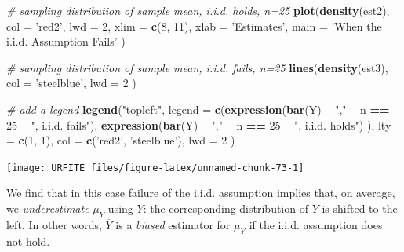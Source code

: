 \documentclass[]{book}
\newenvironment{Shaded}{\begin{snugshade}}{\end{snugshade}}
\newcommand{\KeywordTok}[1]{\textcolor[rgb]{0.13,0.29,0.53}{\textbf{#1}}}
\newcommand{\DataTypeTok}[1]{\textcolor[rgb]{0.13,0.29,0.53}{#1}}
\newcommand{\DecValTok}[1]{\textcolor[rgb]{0.00,0.00,0.81}{#1}}
\newcommand{\StringTok}[1]{\textcolor[rgb]{0.31,0.60,0.02}{#1}}
\newcommand{\CommentTok}[1]{\textcolor[rgb]{0.56,0.35,0.01}{\textit{#1}}}
\newcommand{\OperatorTok}[1]{\textcolor[rgb]{0.81,0.36,0.00}{\textbf{#1}}}
\newcommand{\NormalTok}[1]{#1}
\theoremstyle{definition}
\theoremstyle{definition}
\theoremstyle{definition}
\theoremstyle{remark}
\begin{document}
\begin{Shaded}
\begin{Highlighting}[]
\CommentTok{# sampling distribution of sample mean, i.i.d. holds, n=25}
\KeywordTok{plot}\NormalTok{(}\KeywordTok{density}\NormalTok{(est2), }
      \DataTypeTok{col =} \StringTok{'red2'}\NormalTok{,}
      \DataTypeTok{lwd =} \DecValTok{2}\NormalTok{,}
      \DataTypeTok{xlim =} \KeywordTok{c}\NormalTok{(}\DecValTok{8}\NormalTok{, }\DecValTok{11}\NormalTok{),}
      \DataTypeTok{xlab =} \StringTok{'Estimates'}\NormalTok{,}
      \DataTypeTok{main =} \StringTok{'When the i.i.d. Assumption Fails'}
\NormalTok{     )}

\CommentTok{# sampling distribution of sample mean, i.i.d. fails, n=25}
\KeywordTok{lines}\NormalTok{(}\KeywordTok{density}\NormalTok{(est3),}
      \DataTypeTok{col =} \StringTok{'steelblue'}\NormalTok{,}
      \DataTypeTok{lwd =} \DecValTok{2}
\NormalTok{      )}

\CommentTok{# add a legend}
\KeywordTok{legend}\NormalTok{(}\StringTok{"topleft"}\NormalTok{,}
       \DataTypeTok{legend =} \KeywordTok{c}\NormalTok{(}\KeywordTok{expression}\NormalTok{(}\KeywordTok{bar}\NormalTok{(Y) }\OperatorTok{~}\StringTok{ ","} \OperatorTok{~}\StringTok{ }\NormalTok{n }\OperatorTok{==}\StringTok{ }\DecValTok{25} \OperatorTok{~}\StringTok{ ", i.i.d. fails"}\NormalTok{),}
                  \KeywordTok{expression}\NormalTok{(}\KeywordTok{bar}\NormalTok{(Y) }\OperatorTok{~}\StringTok{ ","} \OperatorTok{~}\StringTok{ }\NormalTok{n }\OperatorTok{==}\StringTok{ }\DecValTok{25} \OperatorTok{~}\StringTok{ ", i.i.d. holds"}\NormalTok{)}
\NormalTok{                  ), }
       \DataTypeTok{lty =} \KeywordTok{c}\NormalTok{(}\DecValTok{1}\NormalTok{, }\DecValTok{1}\NormalTok{), }
       \DataTypeTok{col =} \KeywordTok{c}\NormalTok{(}\StringTok{'red2'}\NormalTok{, }\StringTok{'steelblue'}\NormalTok{),}
       \DataTypeTok{lwd =} \DecValTok{2}
\NormalTok{       )}
\end{Highlighting}
\end{Shaded}

\begin{center}\texttt{[image: URFITE\_files/figure-latex/unnamed-chunk-73-1]} \end{center}

We find that in this case failure of the i.i.d. assumption implies that,
on average, we \emph{underestimate} \(\mu_Y\) using \(\overline{Y}\):
the corresponding distribution of \(\overline{Y}\) is shifted to the
left. In other words, \(\overline{Y}\) is a \emph{biased} estimator for
\(\mu_Y\) if the i.i.d. assumption does not hold.
\end{document}
